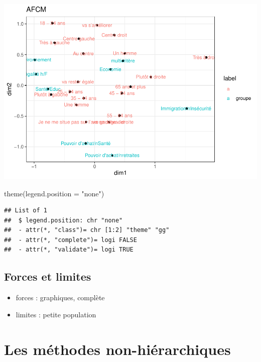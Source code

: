\documentclass[
]{book}
\newenvironment{Shaded}{\begin{snugshade}}{\end{snugshade}}
\newcommand{\AttributeTok}[1]{\textcolor[rgb]{0.77,0.63,0.00}{#1}}
\newcommand{\FunctionTok}[1]{\textcolor[rgb]{0.00,0.00,0.00}{#1}}
\newcommand{\NormalTok}[1]{#1}
\newcommand{\StringTok}[1]{\textcolor[rgb]{0.31,0.60,0.02}{#1}}
\providecommand{\tightlist}{%
  \setlength{\itemsep}{0pt}\setlength{\parskip}{0pt}}
\begin{document}
\includegraphics{bookdown-demo_files/figure-latex/0820-1.pdf}

\begin{Shaded}
\begin{Highlighting}[]
  \FunctionTok{theme}\NormalTok{(}\AttributeTok{legend.position =} \StringTok{"none"}\NormalTok{)}
\end{Highlighting}
\end{Shaded}

\begin{verbatim}
## List of 1
##  $ legend.position: chr "none"
##  - attr(*, "class")= chr [1:2] "theme" "gg"
##  - attr(*, "complete")= logi FALSE
##  - attr(*, "validate")= logi TRUE
\end{verbatim}

\hypertarget{forces-et-limites}{%
\subsection{Forces et limites}\label{forces-et-limites}}

\begin{itemize}
\tightlist
\item
  forces : graphiques, complète
\item
  limites : petite population
\end{itemize}

\hypertarget{les-muxe9thodes-non-hiuxe9rarchiques}{%
\section{Les méthodes non-hiérarchiques}\label{les-muxe9thodes-non-hiuxe9rarchiques}}
\end{document}
